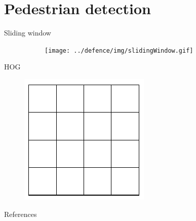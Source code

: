 \documentclass[14pt,t]{beamer}
\begin{document}
\section{Pedestrian detection}
%
\begin{frame}{Sliding window}
\begin{figure}
\centering
	\begin{subfigure}[t]{0.75\textwidth}
		\texttt{[image: ../defence/img/slidingWindow.gif]}
	\end{subfigure}
\end{figure}
\end{frame}
%
\begin{frame}{HOG \cite{dalal2005histograms}}
\begin{minipage}[t]{0.7\textwidth}
\end{minipage}
\begin{minipage}[t]{0.25\textwidth}
	\begin{figure}
		\includegraphics[width=\textwidth]{../report/img/siftGrid.pdf}
	\end{figure}
\end{minipage}
\end{frame}
%
\begin{frame}{References}
\printbibliography
\end{frame}
%
\end{document}
